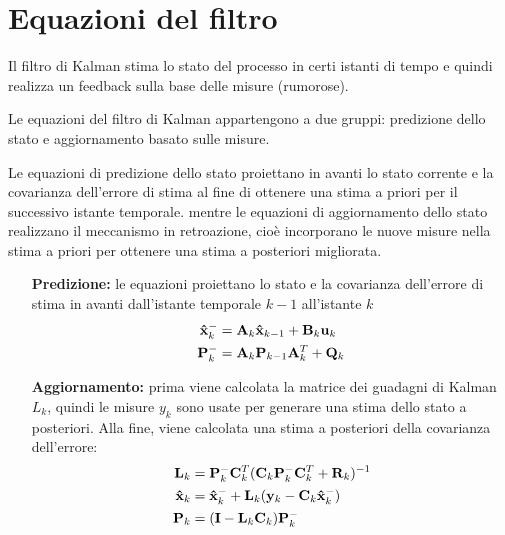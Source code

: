 \section{Equazioni del filtro}

Il filtro di Kalman stima lo stato del processo in certi istanti di tempo e quindi realizza un feedback sulla base delle misure (rumorose).

Le equazioni del filtro di Kalman appartengono a due gruppi:
predizione dello stato e aggiornamento basato sulle misure.

Le equazioni di predizione dello stato proiettano in avanti lo stato corrente e la covarianza dell’errore di stima al fine di ottenere una stima a priori per il successivo istante temporale.
mentre le equazioni di aggiornamento dello stato realizzano il meccanismo in retroazione, cioè incorporano le nuove misure nella stima a priori per ottenere una stima a posteriori migliorata.

\begin{itemize}
\item[\textbf{Predizione:}]le equazioni proiettano lo stato e la covarianza dell’errore di stima in avanti dall’istante temporale $k-1$ all’istante $k$ 
\begin{align*}
\mathbf{\hat{x}}_k^- &= \mathbf{A}_k\mathbf{\hat{x}}_{k-1} + \mathbf{B}_k\mathbf{u}_k \\
\mathbf{P}_k^- &= \mathbf{A}_k\mathbf{P}_{k-1}\mathbf{A}_k^T + \mathbf{Q}_k
\end{align*}

\item[\textbf{Aggiornamento:}] prima viene calcolata la matrice dei guadagni di Kalman $L_k$, quindi le misure $y_k$ sono usate per generare una stima dello stato a posteriori. Alla fine, viene calcolata una stima a posteriori della covarianza dell’errore:
\begin{align*}
\mathbf{L}_k &= \mathbf{P}_k^-\mathbf{C}_k^T(\mathbf{C}_k\mathbf{P}_k^-\mathbf{C}_k^T + \mathbf{R}_k)^{-1}\\
\mathbf{\hat{x}}_k &= \mathbf{\hat{x}}_k^- + \mathbf{L}_k(\mathbf{y}_k - \mathbf{C}_k\mathbf{\hat{x}}_k^-)\\
\mathbf{P}_k &= (\mathbf{I} - \mathbf{L}_k\mathbf{C}_k)\mathbf{P}_k^-
\end{align*}

\end{itemize}

